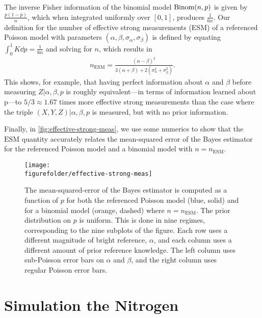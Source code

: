 \documentclass[aps,nofootinbib,prl,twocolumn,superscriptaddress]{revtex4}
\newcommand{\figurefolder}{../fig}
\newcommand{\ESM}{\text{ESM}}
\begin{document}
The inverse Fisher information of the binomial model $\operatorname{Binom}(n,p)$
is given by $\frac{p(1-p)}{n}$, which when integrated uniformly over 
$[0,1]$, produces $\frac{1}{6n}$.
Our definition for the number of effective strong measurements (ESM)
of a referenced Poisson model with parameters 
$(\alpha,\beta,\sigma_\alpha,\sigma_\beta)$ is defined by 
equating $\int_0^1 K\dd p=\frac{1}{6n}$ and solving for $n$,
which results in
\begin{align}
    n_\ESM = \frac{
            (\alpha-\beta)^2
        }{
            3(\alpha+\beta)+2\left(\sigma_\alpha^2+\sigma_\beta^2\right)
        }.
\end{align}
This shows, for example, 
that having perfect information about $\alpha$ and $\beta$
before measuring $Z|\alpha,\beta,p$ is roughly equivalent---in terms
of information learned about p---to 
$5/3\approx 1.67$ times more effective strong measurements 
than the case where the triple $(X,Y,Z)|\alpha,\beta,p$ is
measured, but with no prior information.

Finally, in \autoref{fig:effective-strong-meas}, we use some numerics
to show that the $\ESM$
quantity accurately relates the mean-squared error of the Bayes estimator
for the referenced Poisson model and a binomial model with $n=n_\ESM$.

\begin{figure}
    \texttt{[image: \\figurefolder/effective-strong-meas]}
    \caption{The mean-squared-error of the Bayes estimator is computed
    as a function of $p$
    for both the referenced Poisson model (blue, solid) and for a binomial model
    (orange, dashed) where $n=n_\ESM$.
    The prior distribution on $p$ is uniform.
    This is done in nine regimes, corresponding to the nine subplots of the figure.
    Each row uses a different magnitude of bright reference, $\alpha$,
    and each column uses a different amount of prior reference knowledge.
    The left column uses sub-Poisson error bars on $\alpha$ and $\beta$,
    and the right column uses regular Poisson error bars.}
    \label{fig:effective-strong-meas}
\end{figure}

\section{Simulation the Nitrogen}
\label{apx:nitrogen-sim}
\end{document}
